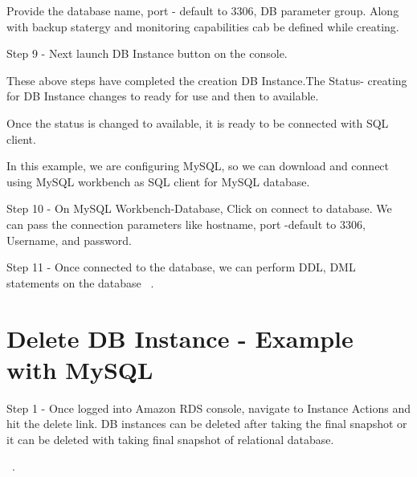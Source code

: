 Provide the database name, port - default to 3306, DB parameter group. 
Along with backup statergy and monitoring capabilities cab be defined 
while creating.

Step 9 - Next launch DB Instance button on the console.

These above steps have completed the creation DB Instance.The Status- 
creating for DB Instance changes to ready for use and then to available.

Once the status is changed to available, it is ready to be connected 
with SQL client.

In this example, we are configuring MySQL, so we can download and connect 
using MySQL workbench as SQL client for MySQL database. 

Step 10 - On MySQL Workbench-Database, Click on connect to database. We 
can pass the connection parameters like hostname, port -default to 3306, 
Username, and password.

Step 11 - Once connected to the database, we can perform DDL, DML 
statements on the database
~\cite{hid-sp18-520-amazonrdscreatesteps}.

\section{Delete DB Instance - Example with MySQL}

Step 1 - Once logged into Amazon RDS console, navigate to Instance Actions 
and hit the delete link.
DB instances can be deleted after taking the final snapshot or it can be 
deleted with taking final snapshot of relational database.

~\cite{hid-sp18-520-amazonrdscreatesteps}.



 